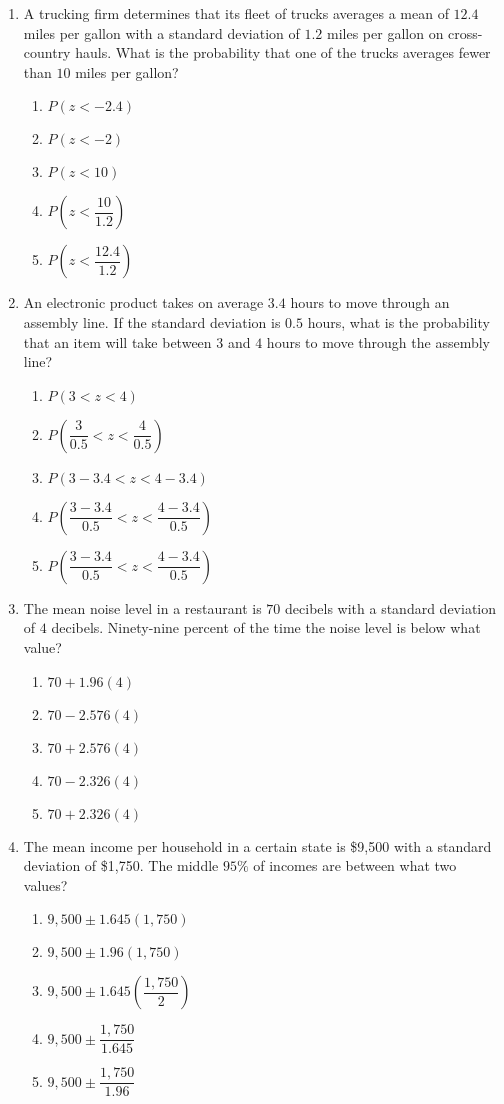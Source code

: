 \documentclass{article}
\begin{document}
\begin{enumerate}
\item A trucking firm determines that its fleet of trucks averages a mean of $12.4$ miles per gallon with a standard deviation of $1.2$ miles per gallon on cross-country hauls. What is the probability that one of the trucks averages fewer than $10$ miles per gallon? 
\begin{enumerate}
  \item $P\!\left(z<-2.4\right)$
  \item $P\!\left(z<-2\right)$
  \item $P\!\left(z<10\right)$
  \item $P\!\left(z<\dfrac{10}{1.2}\right)$
  \item $P\!\left(z<\dfrac{12.4}{1.2}\right)$
\end{enumerate}

\item An electronic product takes on average $3.4$ hours to move through an assembly line. If the standard deviation is $0.5$ hours, what is the probability that an item will take between $3$ and $4$ hours to move through the assembly line? 
\begin{enumerate}
  \item $P(3<z<4)$
  \item $P\!\left(\dfrac{3}{0.5}<z<\dfrac{4}{0.5}\right)$
  \item $P(3-3.4<z<4-3.4)$
  \item $P\!\left(\dfrac{3-3.4}{\,0.5\,}<z<\dfrac{4-3.4}{\,0.5\,}\right)$
  \item $P\!\left(\dfrac{3-3.4}{0.5}<z<\dfrac{4-3.4}{0.5}\right)$
\end{enumerate}

\item The mean noise level in a restaurant is $70$ decibels with a standard deviation of $4$ decibels. Ninety-nine percent of the time the noise level is below what value? 
\begin{enumerate}
  \item $70+1.96(4)$
  \item $70-2.576(4)$
  \item $70+2.576(4)$
  \item $70-2.326(4)$
  \item $70+2.326(4)$
\end{enumerate}

\item The mean income per household in a certain state is \$9{,}500 with a standard deviation of \$1{,}750. The middle $95\%$ of incomes are between what two values? 
\begin{enumerate}
  \item $9{,}500 \pm 1.645(1{,}750)$
  \item $9{,}500 \pm 1.96(1{,}750)$
  \item $9{,}500 \pm 1.645\!\left(\dfrac{1{,}750}{2}\right)$
  \item $9{,}500 \pm \dfrac{1{,}750}{1.645}$
  \item $9{,}500 \pm \dfrac{1{,}750}{1.96}$
\end{enumerate}


\end{enumerate}
\end{document}
